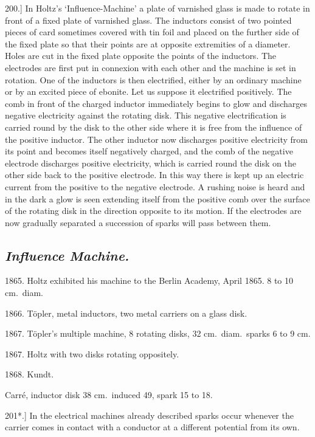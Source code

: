 \documentclass[12pt,oneside]{book}[2021/10/04]
\newcommand{\Heading}{\centering\normalfont}
\newcommand{\Subsection}[1]{\subsection*{\normalsize\Heading\itshape #1}}
\newcommand{\Runhead}[1]{\fancyhead[C]{\iffloatpage{}{\small#1}}}
\newcommand{\article}[1]{\phantomsection \label{art:#1}{#1.]}}
\newcommand{\¬}{\hphantom{0}}
\begin{document}
\article{200} In Holtz's `Influence-Machine' a plate of varnished glass
is made to rotate in front of a fixed plate of varnished glass. The
inductors consist of two pointed pieces of card sometimes covered
with tin foil and placed on the further side of the fixed plate so
that their points are at opposite extremities of a diameter. Holes
are cut in the fixed plate opposite the points of the inductors. The
electrodes are first put in connexion with each other and the
machine is set in rotation. One of the inductors is then electrified,
either by an ordinary machine or by an excited piece of ebonite.
Let us suppose it electrified positively. The comb in front of the
charged inductor immediately begins to glow and discharges negative
electricity against the rotating disk. This negative electrification
is carried round by the disk to the other side where it is free
from the influence of the positive inductor. The other inductor
now discharges positive electricity from its point and becomes
itself negatively charged, and the comb of the negative electrode
discharges positive electricity, which is carried round the disk on
the other side back to the positive electrode. In this way there
is kept up an electric current from the positive to the negative
electrode. A rushing noise is heard and in the dark a glow is
seen extending itself from the positive comb over the surface of the
rotating disk in the direction opposite to its motion. If the electrodes
are now gradually separated a succession of sparks will pass
between them.
\Runhead{HOLTZ'S MACHINE.}

\Subsection{Influence Machine.}
\begin{description}[leftmargin=5em, itemindent=-4em, parsep=0.3ex, itemsep=0ex]
\item[]1865. Holtz exhibited his machine to the Berlin Academy, April
1865. 8 to 10 cm.\ diam.
\item[]1866. Töpler, metal inductors, two metal carriers on a glass
disk.
\item[]1867. Töpler's multiple machine, 8 rotating disks, 32 cm.\ diam.\
sparks 6 to 9 cm.
\item[]1867. Holtz with two disks rotating oppositely.
\item[]1868. Kundt.
\item[]\hphantom{1868. }Carré, inductor disk 38 cm.\ induced 49, spark 15 to 18.
\end{description}

\vspace{.5ex}
\article{201*} In the electrical machines already described sparks occur
whenever the carrier comes in contact with a conductor at a
different potential from its own.
\end{document}
